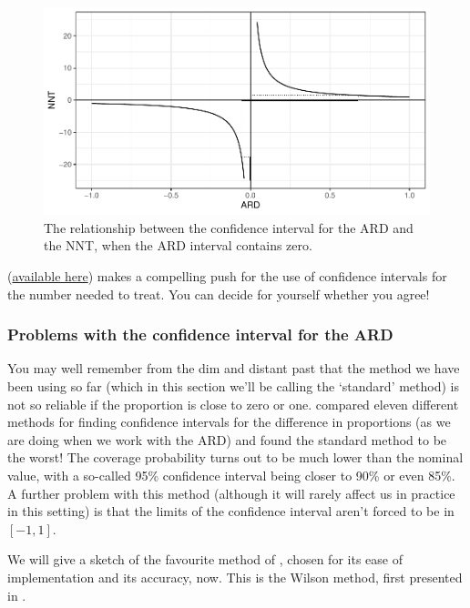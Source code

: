 \documentclass[
  openany]{book}
\theoremstyle{definition}
\theoremstyle{definition}
\theoremstyle{definition}
\theoremstyle{definition}
\theoremstyle{remark}
\begin{document}
\begin{figure}
\centering
\includegraphics{CT4H_notes_files/figure-latex/unnamed-chunk-30-1.pdf}
\caption{\label{fig:unnamed-chunk-30}The relationship between the confidence interval for the ARD and the NNT, when the ARD interval contains zero.}
\end{figure}

\citet{altman1998confidence} (\href{https://www.bmj.com/content/bmj/317/7168/1309.full.pdf}{available here}) makes a compelling push for the use of confidence intervals for the number needed to treat. You can decide for yourself whether you agree!

\subsubsection*{Problems with the confidence interval for the ARD}\label{problems-with-the-confidence-interval-for-the-ard}

You may well remember from the dim and distant past that the method we have been using so far (which in this section we'll be calling the `standard' method) is not so reliable if the proportion is close to zero or one. \citet{newcombe1998interval} compared eleven different methods for finding confidence intervals for the difference in proportions (as we are doing when we work with the ARD) and found the standard method to be the worst! The coverage probability turns out to be much lower than the nominal value, with a so-called 95\% confidence interval being closer to 90\% or even 85\%. A further problem with this method (although it will rarely affect us in practice in this setting) is that the limits of the confidence interval aren't forced to be in \(\left[-1,1\right]\).

We will give a sketch of the favourite method of \citet{newcombe1998interval}, chosen for its ease of implementation and its accuracy, now. This is the Wilson method, first presented in \citet{wilson1927probable}.
\end{document}
